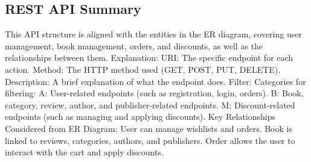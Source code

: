\subsection{REST API Summary}


This API structure is aligned with the entities in the ER diagram, covering user management, book management, orders, and discounts, as well as the relationships between them.
Explanation:
URI: The specific endpoint for each action.
Method: The HTTP method used (GET, POST, PUT, DELETE).
Description: A brief explanation of what the endpoint does.
Filter: Categories for filtering:
A: User-related endpoints (such as registration, login, orders).
B: Book, category, review, author, and publisher-related endpoints.
M: Discount-related endpoints (such as managing and applying discounts).
Key Relationships Considered from ER Diagram:
User can manage wishlists and orders.
Book is linked to reviews, categories, authors, and publishers.
Order allows the user to interact with the cart and apply discounts.


